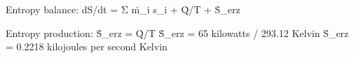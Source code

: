 Entropy balance:  
dS/dt = Σ ṁ_i s_i + Q̇/T + Ṡ_erz  

Entropy production:  
Ṡ_erz = Q̇/T  
Ṡ_erz = 65 kilowatts / 293.12 Kelvin  
Ṡ_erz = 0.2218 kilojoules per second Kelvin